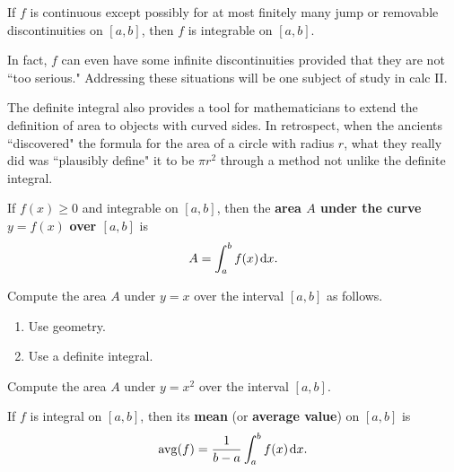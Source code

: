\vfill

\begin{theorem}
If $f$ is continuous  except possibly for at most finitely many jump or removable discontinuities on $[a,b]$, then $f$ is integrable on $[a,b]$.
\end{theorem}
\begin{remark}
In fact, $f$ can even have some infinite discontinuities provided that they are not ``too serious."
Addressing these situations will be one subject of study in calc II.
\end{remark}

\vfill

\begin{remark}
The definite integral also provides a tool for mathematicians to extend the definition of area to objects with curved sides.
In retrospect, when the ancients ``discovered" the formula for the area of a circle with radius $r$, what they really did was ``plausibly define" it to be $\pi r^2$ through a method not unlike the definite integral.
\end{remark}

\begin{definition}
If $f(x)\ge 0$ and integrable on $[a,b]$, then the \textbf{area $A$ under the curve $y=f(x)$} \textbf{over $[a,b]$} is 
\begin{equation*}
A=\int_a^bf(x)\mkern 2mu \mathrm{d} x.
\end{equation*}
\end{definition}

\vfill

\newpage

\begin{example}
Compute the area $A$ under $y=x$ over the interval $[a,b]$ as follows.
\begin{enumerate}[label=(\alph*)]
\item Use geometry.
\item Use a definite integral.
\end{enumerate}
\end{example}

\newpage

\begin{example}
Compute the area $A$ under $y=x^2$ over the interval $[a,b]$.
\end{example}

\newpage

\begin{definition}
If $f$ is integral on $[a,b]$, then its \textbf{mean} (or \textbf{average value}) on $[a,b]$ is
\begin{equation*}
\operatorname{avg}(f) = \frac{1}{b-a}\int_a^bf(x)\mkern 2mu \mathrm{d} x.
\end{equation*}
\end{definition}


